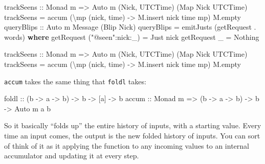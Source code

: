 \documentclass[]{article}
\newenvironment{Shaded}{}{}
\newcommand{\KeywordTok}[1]{\textcolor[rgb]{0.00,0.44,0.13}{\textbf{{#1}}}}
\newcommand{\DataTypeTok}[1]{\textcolor[rgb]{0.56,0.13,0.00}{{#1}}}
\newcommand{\StringTok}[1]{\textcolor[rgb]{0.25,0.44,0.63}{{#1}}}
\newcommand{\OtherTok}[1]{\textcolor[rgb]{0.00,0.44,0.13}{{#1}}}
\newcommand{\FunctionTok}[1]{\textcolor[rgb]{0.02,0.16,0.49}{{#1}}}
\newcommand{\NormalTok}[1]{{#1}}
\begin{document}
\begin{Shaded}
\begin{Highlighting}[]
\OtherTok{    trackSeens ::} \DataTypeTok{Monad} \NormalTok{m }\OtherTok{=>} \DataTypeTok{Auto} \NormalTok{m (}\DataTypeTok{Nick}\NormalTok{, }\DataTypeTok{UTCTime}\NormalTok{) (}\DataTypeTok{Map} \DataTypeTok{Nick} \DataTypeTok{UTCTime}\NormalTok{)}
    \NormalTok{trackSeens }\FunctionTok{=} \NormalTok{accum (\textbackslash{}mp (nick, time) }\OtherTok{->} \NormalTok{M.insert nick time mp) M.empty}
\OtherTok{    queryBlips ::} \DataTypeTok{Auto} \NormalTok{m }\DataTypeTok{Message} \NormalTok{(}\DataTypeTok{Blip} \DataTypeTok{Nick}\NormalTok{)}
    \NormalTok{queryBlips }\FunctionTok{=} \NormalTok{emitJusts (getRequest }\FunctionTok{.} \NormalTok{words)}
      \KeywordTok{where}
        \NormalTok{getRequest (}\StringTok{"@seen"}\FunctionTok{:}\NormalTok{nick}\FunctionTok{:}\NormalTok{_) }\FunctionTok{=} \DataTypeTok{Just} \NormalTok{nick}
        \NormalTok{getRequest _                }\FunctionTok{=} \DataTypeTok{Nothing}



\OtherTok{trackSeens ::} \DataTypeTok{Monad} \NormalTok{m }\OtherTok{=>} \DataTypeTok{Auto} \NormalTok{m (}\DataTypeTok{Nick}\NormalTok{, }\DataTypeTok{UTCTime}\NormalTok{) (}\DataTypeTok{Map} \DataTypeTok{Nick} \DataTypeTok{UTCTime}\NormalTok{)}
\NormalTok{trackSeens }\FunctionTok{=} \NormalTok{accum (\textbackslash{}mp (nick, time) }\OtherTok{->} \NormalTok{M.insert nick time mp) M.empty}
\end{Highlighting}
\end{Shaded}

\texttt{accum} takes the same thing that \texttt{foldl} takes:

\begin{Shaded}
\begin{Highlighting}[]
\NormalTok{foldl}\OtherTok{ ::}            \NormalTok{(b }\OtherTok{->} \NormalTok{a }\OtherTok{->} \NormalTok{b) }\OtherTok{->} \NormalTok{b }\OtherTok{->} \NormalTok{[a] }\OtherTok{->} \NormalTok{b}
\OtherTok{accum ::} \DataTypeTok{Monad} \NormalTok{m }\OtherTok{=>} \NormalTok{(b }\OtherTok{->} \NormalTok{a }\OtherTok{->} \NormalTok{b) }\OtherTok{->} \NormalTok{b }\OtherTok{->} \DataTypeTok{Auto} \NormalTok{m a b}
\end{Highlighting}
\end{Shaded}

So it basically ``folds up'' the entire history of inputs, with a
starting value. Every time an input comes, the output is the new folded
history of inputs. You can sort of think of it as it applying the
function to any incoming values to an internal accumulator and updating
it at every step.
\end{document}
